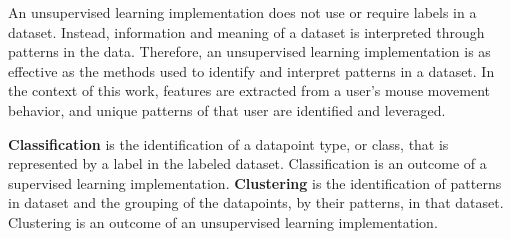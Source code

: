 An unsupervised learning implementation does not use or require labels in a dataset.
Instead, information and meaning of a dataset is interpreted through patterns in the data.
Therefore, an unsupervised learning implementation is as effective as the methods used to identify and interpret patterns in a dataset.
In the context of this work, features are extracted from a user's mouse movement behavior, and unique patterns of that user are identified and leveraged.

\textbf{Classification} is the identification of a datapoint type, or class, that is represented by a label in the labeled dataset.
Classification is an outcome of a supervised learning implementation.
\textbf{Clustering} is the identification of patterns in dataset and the grouping of the datapoints, by their patterns, in that dataset.
Clustering is an outcome of an unsupervised learning implementation.
